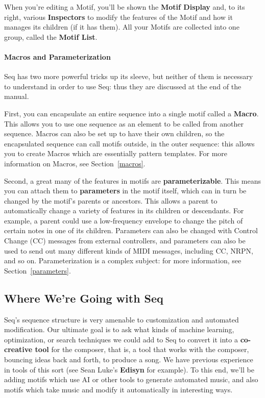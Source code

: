 \documentclass[twoside,10pt]{article}
\begin{document}
When you're editing a Motif, you'll be shown the {\bf Motif Display} and, to its right, various {\bf Inspectors} to modify the features of the Motif and how it manages its children (if it has them).  All your Motifs are collected into one group, called the {\bf Motif List}.

\paragraph{Macros and Parameterization}

Seq has two more powerful tricks up its sleeve, but neither of them is necessary to understand in order to use Seq: thus they are discussed at the end of the manual.

First, you can encapsulate an entire sequence into a single motif called a {\bf Macro}.  This allows you to use one sequence as an element to be called from another sequence.  Macros can also be set up to have their own children, so the encapsulated sequence can call motifs outside, in the outer sequence: this allows you to create Macros which are essentially pattern templates.  For more information on Macros, see Section~\ref{macros}.

Second, a great many of the features in motifs are {\bf parameterizable}.  This means you can attach them to {\bf parameters} in the motif itself, which can in turn be changed by the motif's parents or ancestors.  This allows a parent to automatically change a variety of features in its children or descendants.  For example, a parent could use a low-frequency envelope to change the pitch of certain notes in one of its children.  Parameters can also be changed with Control Change (CC) messages from external controllers, and parameters can also be used to send out many different kinds of MIDI messages, including CC, NRPN, and so on.  Parameterization is a complex  subject: for more information, see Section~\ref{parameters}.

\subsection{Where We're Going with Seq}

Seq's sequence structure is very amenable to customization and automated modification.  Our ultimate goal is to ask what kinds of machine learning, optimization, or search techniques we could add to Seq to convert it into a {\bf co-creative tool} for the composer, that is, a tool that works with the composer, bouncing ideas back and forth, to produce a song.  We have previous experience in tools of this sort (see Sean Luke's {\bf Edisyn} for example).  To this end, we'll be adding motifs which use AI or other tools to generate automated music, and also motifs which take music and modify it automatically in interesting ways.
\end{document}
